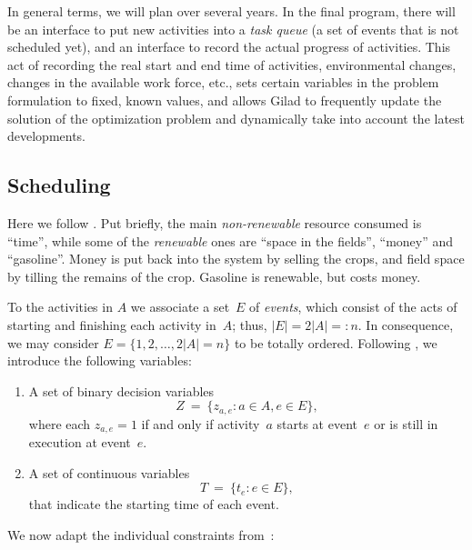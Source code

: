 \documentclass[11pt]{amsart}
\numberwithin{equation}{section}
\begin{document}
In general terms, we will plan over several years. In the final
program, there will be an interface to put new activities into a
\emph{task queue} (a set of events that is not scheduled yet), and an
interface to record the actual progress of activities. This act of
recording the real start and end time of activities, environmental
changes, changes in the available work force, etc., sets certain
variables in the problem formulation to fixed, known values, and
allows Gilad to frequently update the solution of the optimization
problem and dynamically take into account the latest developments.


\subsection{Scheduling}

Here we follow \cite{artigues-etal11}. Put briefly, the main
\emph{non-renewable} resource consumed is ``time'', while some of the
\emph{renewable} ones are ``space in the fields'', ``money'' and
``gasoline''. Money is put back into the system by selling the crops,
and field space by tilling the remains of the crop. Gasoline is
renewable, but costs money.

To the activities in $A$ we associate a set~$E$ of \emph{events},
which consist of the acts of starting and finishing each activity
in~$A$; thus, $|E|=2|A|=:n$. In consequence, we may consider
$E=\{1,2,\dots, 2|A|=n\}$ to be totally ordered.  Following
\cite{artigues-etal11}, we introduce the following variables:

\begin{enumerate}
\item A set of binary decision variables 
  \[
     Z
     \ = \
     \big\{z_{a,e}: a\in A, e\in E\big\},
  \]
  where each $z_{a,e}=1$ if and only if activity~$a$ starts at
  event~$e$ or is still in execution at event~$e$.

\smallskip
\item A set of continuous variables
  \[
     T
     \ = \
     \big\{t_e : e\in E\big\}, 
  \]
  that indicate the starting time of each event.
\end{enumerate}

We now adapt the individual constraints from~\cite{artigues-etal11}:
\end{document}
